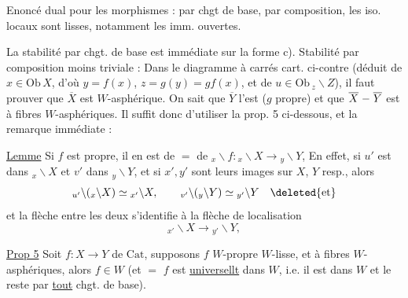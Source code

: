 Enoncé dual pour les morphismes  :  par chgt de base, par composition, les iso. locaux sont lisses, notamment les imm. ouvertes.


La stabilité par chgt. de base est immédiate sur la forme c).  Stabilité par composition moins triviale :  Dans le diagramme à carrés cart. ci-contre (déduit de $x\in\mathrm{Ob}\,X$, d'où $y=f(x)$, $z=g(y)=gf(x)$\deleted{\unsure{)}}, et de $u\in\mathrm{Ob}\,{}_{z}\backslash Z$), il faut prouver que $\overline X$ est $W$-asphérique. On sait que $\overline Y$ l'est ($g$ propre) et que $\overline X\mathrel{\relbar}\overline Y$ est à fibres $W$-asphériques. Il suffit donc d'utiliser la prop. 5 ci-dessous, et la remarque immédiate :

\uline{Lemme} Si $f$ est propre, il en est de $=$ de  $ {}_{x}\backslash f:{}_{x}\backslash X\longrightarrow {}_{y}\backslash Y$,  En effet, si $u'$ est dans $ {}_{x}\backslash X$ et $v'$ dans $ {}_{y}\backslash Y$,  et si $x',y'$ sont leurs images sur $X$, $Y$ resp., alors \[{}_{u'}\backslash({}_{x}\backslash X)\simeq {}_{x'}\backslash X,\qquad {}_{v'}\backslash({}_{y}\backslash Y)\simeq {}_{y'}\backslash Y\quad\deleted{\text{et}}\] et la flèche entre les deux s'identifie à la flèche de localisation \[{}_{x'}\backslash X\longrightarrow {}_{y'}\backslash Y,\]

 \uline{Prop 5} Soit $f:X\longrightarrow Y$ de $\mathrm{Cat}$, supposons $f$ $W$-propre  $W$-lisse, et à fibres $W$-asphériques, alors $f\in W$ (et $=$ $f$ est \uline{universellt} dans $W$, i.e. il est dans $W$ et le reste par \uline{tout} chgt. de base).


